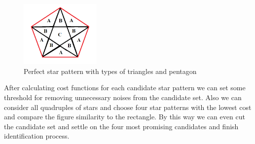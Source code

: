 \begin{figure}[h!]
    \centering
    \includegraphics[width={0.35\textwidth}]{Figures/perfect_star}
    \caption{Perfect star pattern with types of triangles and pentagon}
    \label{fig:perfect_star}
\end{figure}

After calculating cost functions for each candidate star pattern we can set some threshold for removing unnecessary noises from the candidate set. Also we can consider all quadruples of stars and choose four star patterns with the lowest cost and compare the figure similarity to the rectangle. By this way we can even cut the candidate set and settle on the four most promising candidates and finish identification process.